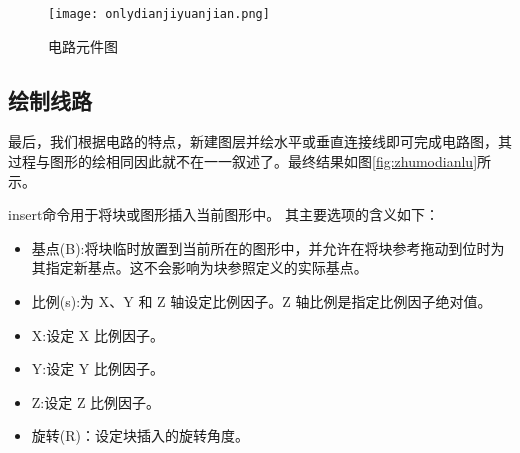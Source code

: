 \noindent
\begin{figure}
\centering
\texttt{[image: onlydianjiyuanjian.png]}
\caption{电路元件图}\label{fig:onlydianziyujian}
\end{figure}
\subsection{绘制线路}
最后，我们根据电路的特点，新建图层并绘水平或垂直连接线即可完成电路图，其过程与图形的绘相同因此就不在一一叙述了。最终结果如图\ref{fig:zhumodianlu}所示。

insert命令用于将块或图形插入当前图形中。 其主要选项的含义如下：
\begin{itemize}
\item 基点(B):将块临时放置到当前所在的图形中，并允许在将块参考拖动到位时为其指定新基点。这不会影响为块参照定义的实际基点。 
\item 比例(s):为 X、Y 和 Z 轴设定比例因子。Z 轴比例是指定比例因子绝对值。
\item X:设定 X 比例因子。
\item Y:设定 Y 比例因子。
\item Z:设定 Z 比例因子。
\item 旋转(R)：设定块插入的旋转角度。
\end{itemize}

\endinput